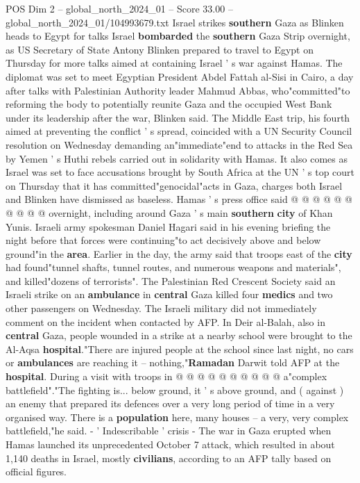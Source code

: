 \begin{textsample}{POS Dim 2 – global\_north\_2024\_01 – Score 33.00 – global\_north\_2024\_01/104993679.txt}  \label{ex:f2_pos_203}
Israel strikes \textbf{southern} Gaza as Blinken heads to Egypt for talks Israel \textbf{bombarded} the \textbf{southern} Gaza Strip overnight, as US Secretary of State Antony Blinken prepared to travel to Egypt on Thursday for more talks aimed at containing Israel ' s war against Hamas.
The diplomat was set to meet Egyptian President Abdel Fattah al-Sisi in Cairo, a day after talks with Palestinian Authority leader Mahmud Abbas, who"committed"to reforming the body to potentially reunite Gaza and the occupied West Bank under its leadership after the war, Blinken said.
The Middle East trip, his fourth aimed at preventing the conflict ' s spread, coincided with a UN Security Council resolution on Wednesday demanding an"immediate"end to attacks in the Red Sea by Yemen ' s Huthi rebels carried out in solidarity with Hamas.
It also comes as Israel was set to face accusations brought by South Africa at the UN ' s top court on Thursday that it has committed"genocidal"acts in Gaza, charges both Israel and Blinken have dismissed as baseless.
Hamas ' s press office said @ @ @ @ @ @ @ @ @ @ overnight, including around Gaza ' s main \textbf{southern} \textbf{city} of Khan Yunis.
Israeli army spokesman Daniel Hagari said in his evening briefing the night before that forces were continuing"to act decisively above and below ground"in the \textbf{area}.
Earlier in the day, the army said that troops east of the \textbf{city} had found"tunnel shafts, tunnel routes, and numerous weapons and materials", and killed"dozens of terrorists".
The Palestinian Red Crescent Society said an Israeli strike on an \textbf{ambulance} in \textbf{central} Gaza killed four \textbf{medics} and two other passengers on Wednesday.
The Israeli military did not immediately comment on the incident when contacted by AFP.
In Deir al-Balah, also in \textbf{central} Gaza, people wounded in a strike at a nearby school were brought to the Al-Aqsa \textbf{hospital}."There are injured people at the school since last night, no cars or \textbf{ambulances} are reaching it -- nothing,"\textbf{Ramadan} Darwit told AFP at the \textbf{hospital}.
During a visit with troops in @ @ @ @ @ @ @ @ @ @ a"complex battlefield"."The fighting is... below ground, it ' s above ground, and ( against ) an enemy that prepared its defences over a very long period of time in a very organised way.
There is a \textbf{population} here, many houses -- a very, very complex battlefield,"he said. - ' Indescribable ' crisis - The war in Gaza erupted when Hamas launched its unprecedented October 7 attack, which resulted in about 1,140 deaths in Israel, mostly \textbf{civilians}, according to an AFP tally based on official figures.

\end{textsample}
